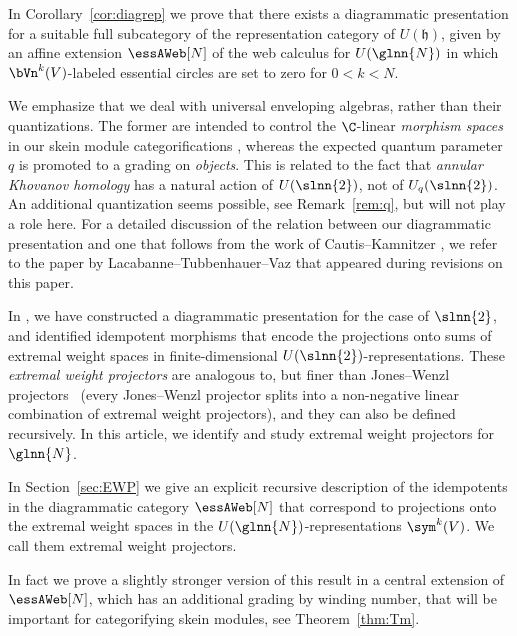 \begin{result}
In Corollary~\ref{cor:diagrep} we prove that there exists a
diagrammatic presentation for a suitable full subcategory of the representation
category of $U(\mathfrak{h})$, given by an affine extension $\essAWeb[N]$ of the
web calculus for $U(\glnn{N})$ in which $\bVn^k(V)$-labeled essential circles
are set to zero for $0<k<N$.
\end{result}

We emphasize that we deal with universal enveloping algebras, rather than their
quantizations. The former are intended to control the $\C$-linear \textit{morphism
spaces} in our skein module categorifications \cite[Section 1.3]{QW}, whereas
the expected quantum parameter $q$ is promoted to a grading on \textit{objects}.
This is related to the fact that \textit{annular Khovanov homology} \cite{GLW}
has a natural action of $U(\slnn{2})$, not of $U_q(\slnn{2})$. An additional
quantization seems possible, see Remark~\ref{rem:q}, but will not play a role
here. For a detailed discussion of the relation between our diagrammatic
presentation and one that follows from the work of Cautis--Kamnitzer
\cite[Section 2.6]{CK_ann}, we refer to the paper by Lacabanne--Tubbenhauer--Vaz
\cite{LTV} that appeared during revisions on this paper.

In \cite{QW}, we have constructed a diagrammatic presentation for the case of
$\slnn{2}$, and identified idempotent morphisms that encode the projections onto
sums of extremal weight spaces in finite-dimensional
$U(\slnn{2})$-representations. These \textit{extremal weight projectors} are
analogous to, but finer than Jones--Wenzl projectors~\cite{Jon2,Wen} (every
Jones--Wenzl projector splits into a non-negative linear combination of extremal
weight projectors), and they can also be defined recursively. In this article,
we identify and study extremal weight projectors for $\glnn{N}$. 

\begin{result} In Section~\ref{sec:EWP} we give an explicit recursive
  description of the idempotents in the diagrammatic category $\essAWeb[N]$ that
  correspond to projections onto the extremal weight spaces in the
  $U(\glnn{N})$-representations $\sym^k(V)$. We call them extremal weight projectors.
\end{result} 

In fact we prove a slightly stronger version of this result in a central
extension of $\essAWeb[N]$, which has an additional grading by winding number,
that will be important for categorifying skein modules, see
Theorem~\ref{thm:Tm}.

